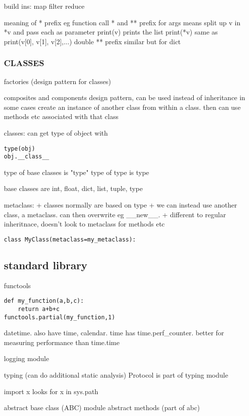 build ins:
map
filter
reduce




meaning of * prefix
eg function call * and ** prefix for args
means split up v in *v and pass each as parameter
print(v) prints the list
print(*v) same as print(v[0], v[1], v[2],...)
double ** prefix similar but for dict

\subsubsection{CLASSES}

factories (design pattern for classes)

composites and components
design pattern, can be used instead of inheritance in some cases
create an instance of another class from within a class. then can use methods etc associated with that class

classes: can get type of object with
\begin{verbatim}
type(obj)
obj.__class__
\end{verbatim}
type of base classes is "type"
type of type is type

base classes are int, float, dict, list, tuple, type

metaclass:
+ classes normally are based on type
+ we can instead use another class, a metaclass. can then overwrite eg \_\_new\_\_.
+ different to regular inheritnace, doesn't look to metaclass for methods etc

\begin{verbatim}
class MyClass(metaclass=my_metaclass):
\end{verbatim}

\subsection{standard library}

functools
\begin{verbatim}
def my_function(a,b,c):
    return a+b+c
functools.partial(my_function,1)
\end{verbatim}


datetime. also have time, calendar. time has time.perf\_counter. better for measuring performance than time.time

logging module

typing (can do additional static analysis)
Protocol is part of typing module

import x looks for x in sys.path

abstract base class (ABC) module
abstract methods (part of abc)

